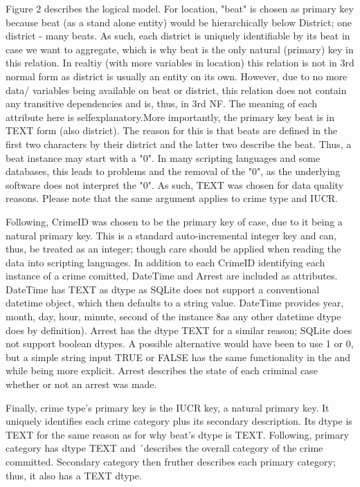 \documentclass[a4paper]{article}
\begin{document}
Figure 2 describes the logical model. For location, "beat" is chosen as primary key because beat (as a stand alone entity) would be hierarchically below District; one district - many beats. As such, each district is uniquely identifiable by its beat in case we want to aggregate, which is why beat is the only natural (primary) key in this relation. In realtiy (with more variables in location) this relation is not in 3rd normal form as district is usually an entity on its own. However, due to no more data/ variables being available on beat or district, this relation does not contain any transitive dependencies and is, thus, in 3rd NF. The meaning of each attribute here is selfexplanatory.More importantly, the primary key beat is in TEXT form (also district). The reason for this is that beats are defined in the first two characters by their district and the latter two describe the beat. Thus, a beat instance may start with a "0". In many scripting languages and some databases, this leads to problems and the removal of the "0", as the underlying software does not interpret the "0". As such, TEXT was chosen for data quality reasons. Please note that the same argument applies to crime type and IUCR. 

\indent Following, CrimeID was chosen to be the primary key of case, due to it being a natural primary key. This is a standard auto-incremental integer key and can, thus, be treated as an integer; though care should be applied when reading the data into scripting languages. In addition to each CrimeID identifying each instance of a crime comitted, DateTime and Arrest are included as attributes. DateTime has TEXT as dtype as SQLite does not support a conventional datetime object, which then defaults to a string value. DateTime provides year, month, day, hour, minute, second of the instance 8as any other datetime dtype does by definition). Arrest has the dtype TEXT for a similar reason; SQLite does not support boolean dtypes. A possible alternative would have been to use 1 or 0, but a simple string input TRUE or FALSE has the same functionality in the and while being more explicit. Arrest describes the state of each criminal case whether or not an arrest was made. 


\indent Finally, crime type's primary key is the IUCR key, a natural primary key. It uniquely identifies each crime category plus its secondary description. Its dtype is TEXT for the same reason as for why beat's dtype is TEXT. Following, primary category has dtype TEXT and ´describes the overall category of the crime committed. Secondary category then fruther describes each primary category; thus, it also has a TEXT dtype. 
\end{document}
